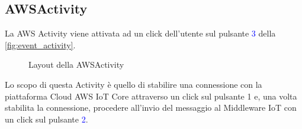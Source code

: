 \subsection{AWSActivity}
\label{subsec:aws_activity}
La AWS Activity viene attivata ad un click dell'utente sul pulsante \textcolor{blue}{3} della \autoref{fig:event_activity}.
\begin{figure}%
	\centering
	\qquad
	\caption{Layout della AWSActivity}%
	\label{fig:aws_activity}%
\end{figure}
Lo scopo di questa Activity è quello di stabilire una connessione con la piattaforma Cloud AWS IoT Core attraverso un click sul pulsante \textcolor{mypink}{1} e, una volta stabilita la connessione, procedere all'invio del messaggio al Middleware IoT con un click sul pulsante \textcolor{blue}{2}. \\
